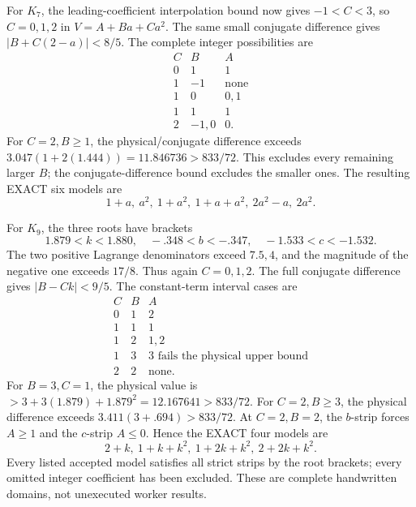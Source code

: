 For \(K_7\), the leading-coefficient interpolation bound now
gives \(-1<C<3\), so \(C=0,1,2\) in \(V=A+Ba+Ca^2\).
The same small conjugate difference gives
\(|B+C(2-a)|<8/5\).
The complete integer possibilities are
\[
\begin{array}{c|c|c}
C&B&A\\ \hline
0&1&1\\
1&-1&\text{none}\\
1&0&0,1\\
1&1&1\\
2&-1,0&0 .
\end{array}
\]
For \(C=2,B\ge1\), the physical/conjugate difference exceeds
\(3.047(1+2(1.444))=11.846736>833/72\).
This excludes every remaining larger \(B\);
the conjugate-difference bound excludes the smaller ones.
The resulting EXACT six models are
\[
                 1+a,\ a^2,\ 1+a^2,\ 1+a+a^2,\ 2a^2-a,\ 2a^2 .
\]

For \(K_9\), the three roots have brackets
\[
 1.879<k<1.880,\quad -.348<b<-.347,\quad -1.533<c<-1.532 .
\]
The two positive Lagrange denominators exceed \(7.5,4\),
and the magnitude of the negative one exceeds \(17/8\).
Thus again \(C=0,1,2\).
The full conjugate difference gives \(|B-Ck|<9/5\).
The constant-term interval cases are
\[
\begin{array}{c|c|c}
C&B&A\\ \hline
0&1&2\\
1&1&1\\
1&2&1,2\\
1&3&3\text{ fails the physical upper bound}\\
2&2&\text{none}.
\end{array}
\]
For \(B=3,C=1\), the physical value is
\(>3+3(1.879)+1.879^2=12.167641>833/72\).
For \(C=2,B\ge3\), the physical difference exceeds
\(3.411(3+.694)>833/72\).
At \(C=2,B=2\), the \(b\)-strip forces \(A\ge1\) and
the \(c\)-strip \(A\le0\).
Hence the EXACT four models are
\[
                     2+k,\ 1+k+k^2,\ 1+2k+k^2,\ 2+2k+k^2 .
\]
Every listed accepted model satisfies all strict strips by the
root brackets; every omitted integer coefficient has been excluded.
These are complete handwritten domains, not unexecuted worker results.

